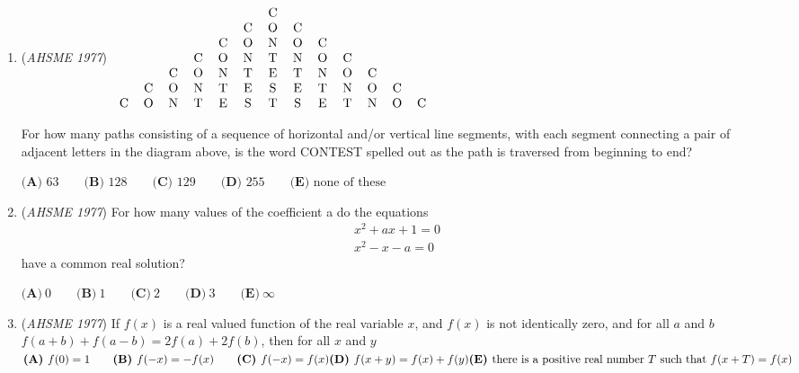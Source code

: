 \begin{enumerate}
 $\textbf{(A) }PQRS\text{ is a parallelogram}\\ \textbf{(B) }PQRS\text{ is a parallelogram if an only if }ABCD\text{ is a rhombus}\\ \textbf{(C) }PQRS\text{ is a parallelogram if an only if }ABCD\text{ is a rectangle}\\ \textbf{(D) }PQRS\text{ is a parallelogram if an only if }ABCD\text{ is a parallelogram}\\ \textbf{(E) }\text{none of the above are true}$


	\item (\textit{AHSME 1977}) $\begin{tabular}{ccccccccccccc}& & & & & & C & & & & & &\\  & & & & & C & O & C & & & & &\\  & & & & C & O & N & O & C & & & &\\  & & & C & O & N & T & N & O & C & & &\\  & & C & O & N & T & E & T & N & O & C & &\\  & C & O & N & T & E & S & E & T & N & O & C &\\  C & O & N & T & E & S & T & S & E & T & N & O & C \end{tabular}$


 

For how many paths consisting of a sequence of horizontal and/or vertical line segments, with each segment connecting a pair of adjacent letters in the diagram above, is the word CONTEST spelled out as the path is traversed from beginning to end?


 $\textbf{(A) }63\qquad \textbf{(B) }128\qquad \textbf{(C) }129\qquad \textbf{(D) }255\qquad  \textbf{(E) }\text{none of these}$


	\item (\textit{AHSME 1977}) For how many values of the coefficient a do the equations 
 \begin{align*}x^2+ax+1=0 \\ x^2-x-a=0\end{align*}
 have a common real solution?


 $\textbf{(A)}\ 0 \qquad \textbf{(B)}\ 1 \qquad \textbf{(C)}\ 2 \qquad \textbf{(D)}\ 3 \qquad \textbf{(E)}\ \infty$


	\item (\textit{AHSME 1977}) If $f(x)$ is a real valued function of the real variable $x$, and $f(x)$ is not identically zero, 
and for all $a$ and $b$ $f(a+b)+f(a-b)=2f(a)+2f(b)$, then for all $x$ and $y$
$\textbf{(A) }f(0)=1\qquad \textbf{(B) }f(-x)=-f(x)\qquad \textbf{(C) }f(-x)=f(x)\qquad \\ \textbf{(D) }f(x+y)=f(x)+f(y) \qquad \\ \textbf{(E) }\text{there is a positive real number }T\text{ such that }f(x+T)=f(x)$



\end{enumerate}
